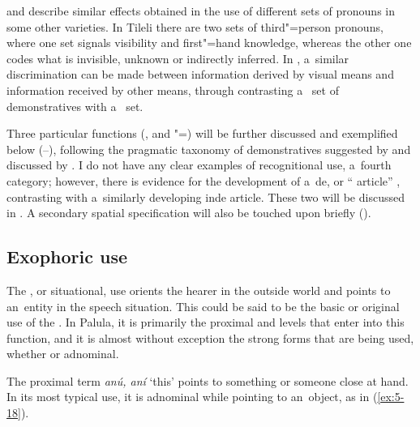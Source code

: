 \citet[204--205, 207--212]{schmidt2000} and \citet[134--136]{schmidtkohistani2001} describe similar effects obtained in the use of different sets of pronouns in some other  varieties. In Tileli there are two sets of third"=person pronouns, where one set signals visibility and first"=hand knowledge, whereas the other one codes what is invisible, unknown or indirectly inferred. In  , a~similar discrimination can be made between information derived by visual means and information received by other means, through contrasting a~ set of demonstratives with a~ set. 



Three particular functions (,  and "=) will be further discussed and exemplified below (--), following the pragmatic taxonomy of demonstratives suggested by \citet[205--254]{himmelmann1996} and discussed by \citet[432]{diessel2006}. I do not have any clear examples of recognitional use, a~fourth category; however, there is evidence for the development of a~de, or `` article'' \citep[486]{juvonen2006}, contrasting with a~similarly developing inde article. These two will be discussed in . A secondary spatial specification will also be touched upon briefly ().


\subsection{Exophoric use}
\label{subsec:5-2-3}

The , or situational, use orients the hearer in the outside world and points to an~entity in the speech situation. This could be said to be the basic or original use of the . In Palula, it is primarily the proximal and  levels that enter into this function, and it is almost without exception the strong forms that are being used, whether  or adnominal.


The proximal term \textit{anú, aní} `this' points to something or someone close at hand. In its most typical use, it is adnominal while pointing to an~object, as in (\ref{ex:5-18}).

